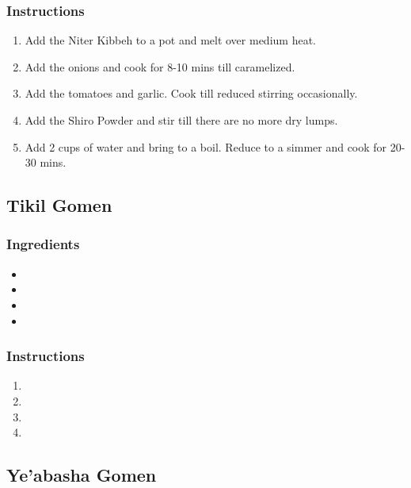 \documentclass[11pt]{article}
\begin{document}
\subsubsection*{Instructions}
\label{sec:orgab4091e}
\begin{enumerate}
\item Add the Niter Kibbeh to a pot and melt over medium heat.
\item Add the onions and cook for 8-10 mins till caramelized.
\item Add the tomatoes and garlic. Cook till reduced stirring occasionally.
\item Add the Shiro Powder and stir till there are no more dry lumps.
\item Add 2 cups of water and bring to a boil. Reduce to a simmer and cook for 20-30 mins.
\end{enumerate}
\subsection{Tikil Gomen}
\label{sec:orgf326119}
\subsubsection*{Ingredients}
\label{sec:org6d91ee0}
\begin{itemize}
\item 

\item 

\item 

\item 
\end{itemize}
\subsubsection*{Instructions}
\label{sec:org20aa23b}
\begin{enumerate}
\item 

\item 

\item 

\item 
\end{enumerate}
\subsection{Ye'abasha Gomen}
\label{sec:org8cff0d2}
\end{document}

